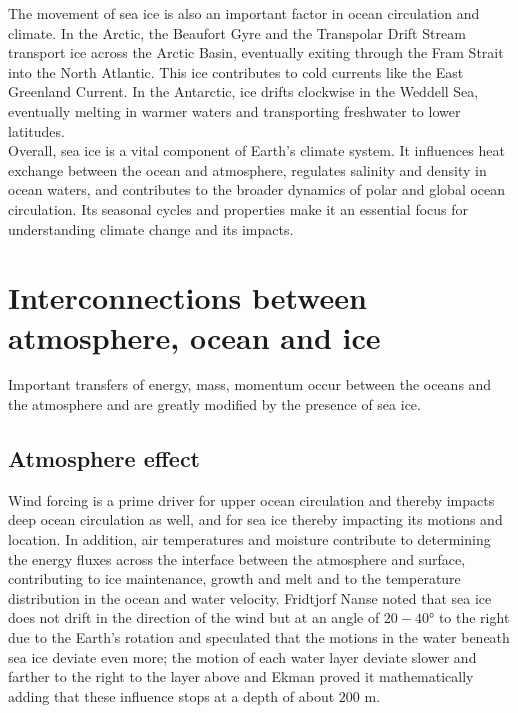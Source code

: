 The movement of sea ice is also an important factor in ocean circulation and climate. In the Arctic, the Beaufort Gyre and the Transpolar Drift Stream transport ice across the Arctic Basin, eventually exiting through the Fram Strait into the North Atlantic. This ice contributes to cold currents like the East Greenland Current. In the Antarctic, ice drifts clockwise in the Weddell Sea, eventually melting in warmer waters and transporting freshwater to lower latitudes. \\
[0.15 cm]

Overall, sea ice is a vital component of Earth's climate system. It influences heat exchange between the ocean and atmosphere, regulates salinity and density in ocean waters, and contributes to the broader dynamics of polar and global ocean circulation. Its seasonal cycles and properties make it an essential focus for understanding climate change and its impacts.

\section{Interconnections between atmosphere, ocean and ice}
Important transfers of energy, mass, momentum occur between the oceans and the atmosphere and are greatly modified by the presence of sea ice.
\subsection{Atmosphere effect}
Wind forcing is a prime driver for upper ocean circulation and thereby impacts deep ocean circulation as well, and for sea ice thereby impacting its motions and location. In addition, air temperatures and moisture contribute to determining the energy fluxes across the interface between the atmosphere and surface, contributing to ice maintenance, growth and melt and to the temperature distribution in the ocean and water velocity.
Fridtjorf Nanse noted that sea ice does not drift in the direction of the wind but at an angle of $20-40°$ to the right due to the Earth’s rotation and speculated that the motions in the water beneath sea ice deviate even more; the motion of each water layer deviate slower and farther to the right to the layer above and Ekman proved it mathematically adding that these influence stops at a depth of about $200$ m.

